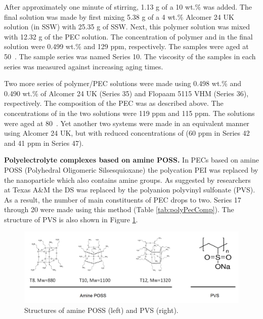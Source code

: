 \documentclass[journal = enfuem, manuscript =  article]{achemso}
\begin{document}

 
After approximately one minute of stirring, 1.13 g of a 10 wt.\%  was added. The final solution was made by first mixing 5.38 g of a 4 wt.\% Alcomer 24 UK solution (in SSW) with 25.35 g of SSW. Next, this polymer solution was mixed with 12.32 g of the PEC solution. The concentration of polymer and  in the final solution were 0.499 wt.\% and 129 ppm, respectively. The samples were aged at 50~\celsius. The sample series was named Series 10. The viscosity of the samples in each series was measured against increasing aging times. 

Two more series of polymer/PEC solutions were made using 0.498 wt.\% and 0.490 wt.\% of Alcomer 24 UK (Series 35) and Flopaam 5115 VHM (Series 36), respectively. The composition of the PEC was as described above. The concentrations of  in the two solutions were 119 ppm and 115 ppm. The solutions were aged at 80~\celsius. Yet another two systems were made in an equivalent manner using Alcomer 24 UK, but with reduced concentrations of  (60 ppm in Series 42 and 41 ppm in Series 47).

\textbf{Polyelectrolyte complexes based on amine POSS.}
In PECs based on amine POSS (Polyhedral Oligomeric Silsesquioxane) the polycation PEI was replaced by the nanoparticle which also contains amine groups. As suggested by researchers at Texas A\&M the DS was replaced by the polyanion polyvinyl sulfonate (PVS). As a result, the number of main constituents of PEC drops to two. Series 17 through 20 were made using this method (Table \ref{tab:polyPecComp}). The structure of PVS is also shown in Figure \ref{fig:pvs}.

\begin{figure}[h]
    \centering
    \includegraphics[width=\textwidth]{fig/pvs.png}
    \caption{Structures of amine POSS (left) and PVS (right).}
    \label{fig:pvs}
\end{figure}
\end{document}

